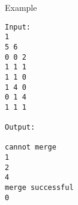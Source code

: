Example
\begin{verbatim}
Input:
1
5 6
0 0 2
1 1 1
1 1 0
1 4 0
0 1 4
1 1 1 

Output:

cannot merge
1
2
4
merge successful
0
\end{verbatim}